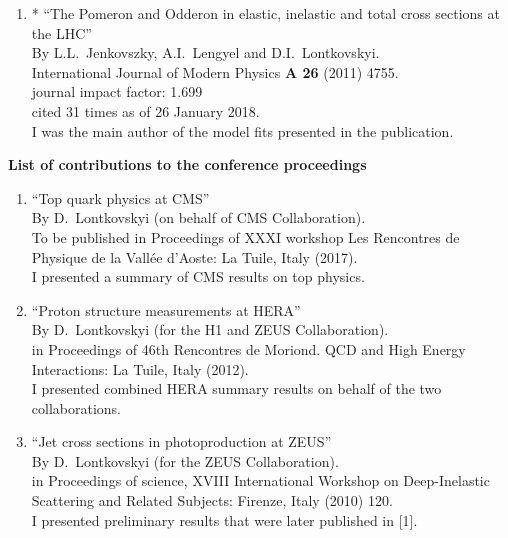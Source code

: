 \begin{enumerate}
	\item*  ``The Pomeron and Odderon in elastic, inelastic and total cross sections at the LHC''\\
	By  L.L.~Jenkovszky, A.I.~Lengyel and D.I.~Lontkovskyi.\\
    International  Journal of Modern Physics {\bf A 26} (2011) 4755.\\
    journal impact factor:  1.699\\
	cited 31 times as of 26 January 2018. \\
	I was the main author of the model fits presented in the publication.
\end{enumerate}

\begin{flushleft}
\textbf{List of contributions to the conference proceedings}\\
\end{flushleft}
\begin{enumerate}
	\item ``Top quark physics at CMS''\\
	By D.~Lontkovskyi (on behalf of CMS Collaboration).\\
	To be published in Proceedings of XXXI workshop Les Rencontres de Physique de la Vallée d'Aoste: La Tuile, Italy (2017).\\
	I presented a summary of CMS results on top physics.
	\item ``Proton structure measurements at HERA''\\
	By D.~Lontkovskyi (for the H1 and ZEUS Collaboration).\\
	in Proceedings of 46th Rencontres de Moriond. QCD and High Energy Interactions: La Tuile, Italy (2012).\\
	I presented combined HERA summary results on behalf of the two collaborations.
	\item ``Jet cross sections in photoproduction at ZEUS''\\
	By D.~Lontkovskyi (for the ZEUS Collaboration).\\
	in Proceedings of science, XVIII International Workshop on Deep-Inelastic Scattering and Related Subjects: Firenze, Italy (2010) 120.\\
	I presented preliminary results that were later published in [1].
\end{enumerate}
